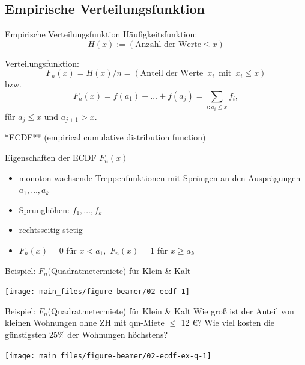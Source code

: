 \documentclass[
  10pt,
  ignorenonframetext,
]{beamer}
\providecommand{\tightlist}{%
  \setlength{\itemsep}{0pt}\setlength{\parskip}{0pt}}
\begin{document}
\subsection{Empirische
Verteilungsfunktion}\label{empirische-verteilungsfunktion}

\begin{frame}{Empirische Verteilungsfunktion}
\label{empirische-verteilungsfunktion-1}
Häufigkeitsfunktion: \[H(x) := (\mbox{Anzahl der Werte} \leq x)  \]

Verteilungsfunktion: \[
F_n(x)  =  H(x)/n = (\mbox{Anteil der Werte}\,\,\, x_i \,\,\, \mbox{mit} \,\,\, x_i
\leq x)
\] bzw. \[
F_n(x) =  f(a_1) + \ldots + f(a_j) = \sum_{i: a_i \leq x} f_i,
\] für \(a_j \leq x\) und \(a_{j+1}>x\).

\scriptsize **ECDF** (empirical cumulative distribution function)
\end{frame}

\begin{frame}{Eigenschaften der ECDF \(F_n(x)\)}
\label{eigenschaften-der-ecdf-f_nx}
\begin{itemize}
\tightlist
\item
  monoton wachsende Treppenfunktionen mit Sprüngen an den Ausprägungen
  \(a_1, \ldots, a_k\)
\item
  Sprunghöhen: \(f_1, \ldots, f_k\)
\item
  rechtsseitig stetig
\item
  \(F_n(x) = 0\) für \(x < a_1, \,\,F_n(x) = 1\) für \(x \geq a_k\)
\end{itemize}
\end{frame}

\begin{frame}{Beispiel: \(F_n\)(Quadratmetermiete) für Klein \& Kalt}
\label{beispiel-f_nquadratmetermiete-fuxfcr-klein-kalt}
\scriptsize

\begin{center}\texttt{[image: main\_files/figure-beamer/02-ecdf-1]} \end{center}

\normalsize
\end{frame}

\begin{frame}{Beispiel: \(F_n\)(Quadratmetermiete) für Klein \& Kalt}
\label{beispiel-f_nquadratmetermiete-fuxfcr-klein-kalt-1}
Wie groß ist der Anteil von kleinen Wohnungen ohne ZH mit qm-Miete
\(\leq\) 12 €? Wie viel kosten die günstigsten 25\% der Wohnungen
höchstens?

\scriptsize

\begin{center}\texttt{[image: main\_files/figure-beamer/02-ecdf-ex-q-1]} \end{center}

\normalsize
\end{frame}
\end{document}

